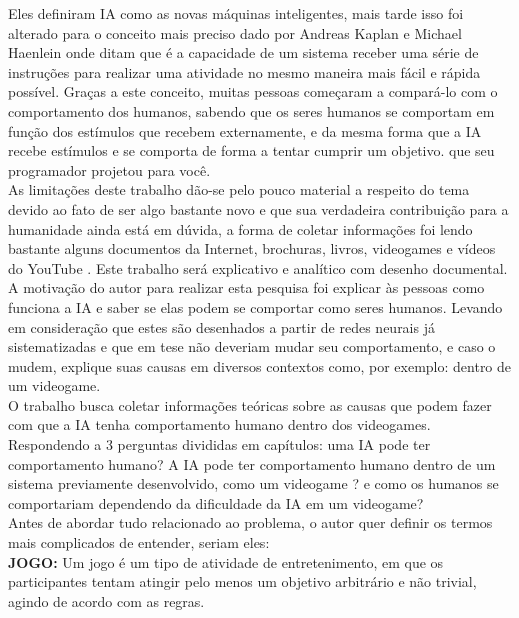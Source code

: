 \documentclass[a4paper]{report}
\begin{document}
Eles definiram \ac{IA} como as novas máquinas inteligentes, mais tarde isso foi alterado para o conceito mais preciso dado por Andreas Kaplan e Michael Haenlein onde ditam que é a capacidade de um sistema receber uma série de instruções para realizar uma atividade no mesmo maneira mais fácil e rápida possível. Graças a este conceito, muitas pessoas começaram a compará-lo com o comportamento dos humanos, sabendo que os seres humanos se comportam em função dos estímulos que recebem externamente, e da mesma forma que a \ac{IA} recebe estímulos e se comporta de forma a tentar cumprir um objetivo. que seu programador projetou para você.\\

As limitações deste trabalho dão-se pelo pouco material a respeito do tema devido ao fato de ser algo bastante novo e que sua verdadeira contribuição para a humanidade ainda está em dúvida, a forma de coletar informações foi lendo bastante alguns documentos da Internet, brochuras, livros, videogames e vídeos do YouTube . Este trabalho será explicativo e analítico com desenho documental.\\

A motivação do autor para realizar esta pesquisa foi explicar às pessoas como funciona a \ac{IA} e saber se elas podem se comportar como seres humanos. Levando em consideração que estes são desenhados a partir de redes neurais já sistematizadas e que em tese não deveriam mudar seu comportamento, e caso o mudem, explique suas causas em diversos contextos como, por exemplo: dentro de um videogame.\\

O trabalho busca coletar informações teóricas sobre as causas que podem fazer com que a \ac{IA} tenha comportamento humano dentro dos videogames. Respondendo a 3 perguntas divididas em capítulos: uma \ac{IA} pode ter comportamento humano? A \ac{IA} pode ter comportamento humano dentro de um sistema previamente desenvolvido, como um videogame ? e como os humanos se comportariam dependendo da dificuldade da \ac{IA} em um videogame?\\

Antes de abordar tudo relacionado ao problema, o autor quer definir os termos mais complicados de entender, seriam eles:\\

\textbf{JOGO:}
Um jogo é um tipo de atividade de entretenimento, em que os participantes tentam atingir pelo menos um objetivo arbitrário e não trivial, agindo de acordo com as regras.\\
\end{document}
